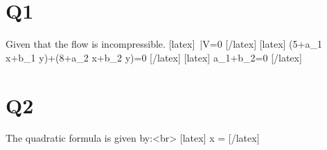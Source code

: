 \section*{Q1}
Given that the flow is incompressible.
[latex] \therefore \quad {}\,\bar{V}=0 [/latex]
[latex] \left(5+a_{1} x+b_{1} y\right)+\left(8+a_{2} x+b_{2} y\right)=0 [/latex]
[latex] a_{1}+b_{2}=0 [/latex]

\section*{Q2}
The quadratic formula is given by:<br>
[latex] x =  [/latex]
